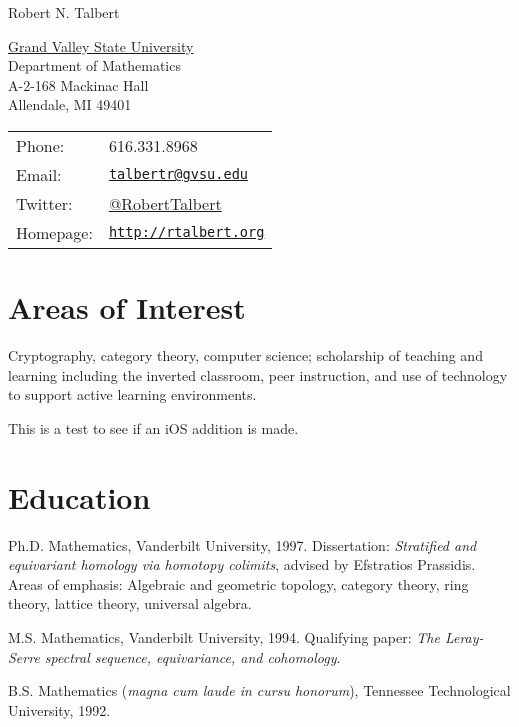 \documentclass[letterpaper]{article}
\def\name{Robert N. Talbert}
\renewenvironment{itemize}{
  \begin{list}{}{
    \setlength{\leftmargin}{1.5em}
	\setlength{\itemsep}{0in}
  }
}{
  \end{list}
}
\begin{document}
{\Large \name}


\vspace{0.25in}

\begin{minipage}{0.45\linewidth}
  \href{http://www.gvsu.edu/}{Grand Valley State University} \\
  Department of Mathematics \\
  A-2-168 Mackinac Hall \\
  Allendale, MI 49401
\end{minipage}
\begin{minipage}{0.45\linewidth}
  \begin{tabular}{ll}
    Phone: & 616.331.8968 \\
    Email: & \href{mailto:talbertr@gvsu.edu}{\tt talbertr@gvsu.edu} \\
	Twitter: & \href{http://www.twitter.com/RobertTalbert}{@RobertTalbert} \\
    Homepage: & \href{http://faculty.gvsu.edu/talbertr/}{\tt http://rtalbert.org} \\
  \end{tabular}
\end{minipage}


\section*{Areas of Interest}

Cryptography, category theory, computer science; scholarship of teaching and learning including the inverted classroom, peer instruction, and use of technology to support active learning environments.

This is a test to see if an iOS addition is made. 

\section*{Education}

\begin{itemize}
  \item Ph.D. Mathematics, Vanderbilt University, 1997. Dissertation: \emph{Stratified and equivariant homology via homotopy colimits}, advised by Efstratios Prassidis. Areas of emphasis: Algebraic and geometric topology, category theory, ring theory, lattice theory, universal algebra.


  \item M.S. Mathematics, Vanderbilt University, 1994. Qualifying paper: \emph{The Leray-Serre spectral sequence, equivariance, and cohomology}. 

  \item B.S. Mathematics (\emph{magna cum laude in cursu honorum}), Tennessee Technological University, 1992. 

\end{itemize}
\end{document}
